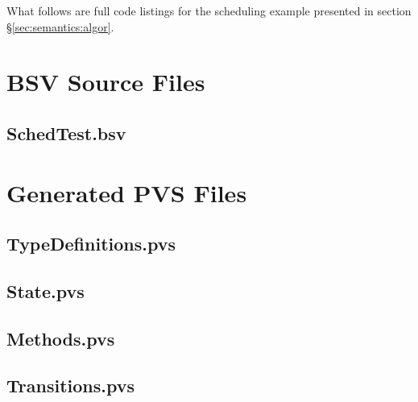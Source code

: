 What follows are full code listings for the scheduling example presented in section \S \ref{sec:semantics:algor}.  

\begin{singlespace}
\section{BSV Source Files} \label{app:schedex:bsv}

\subsection{SchedTest.bsv} \label{app:schedex:bsv:sched}



\section{Generated PVS Files} \label{app:schedex:pvsgen}

\subsection{TypeDefinitions.pvs} \label{app:schedex:pvsgen:td}



\subsection{State.pvs} \label{app:schedex:pvsgen:state}



\subsection{Methods.pvs} \label{app:schedex:pvsgen:meth}



\subsection{Transitions.pvs} \label{app:schedex:pvsgen:trans}




\end{singlespace}
